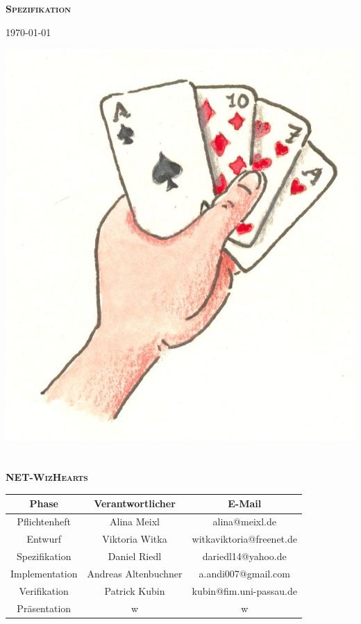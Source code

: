 \documentclass{article}
\begin{document}
\begin{titlepage}

\begin{center}
\textbf{\textsc{\LARGE Spezifikation}}

{\large \today}

\vspace{2cm}
\includegraphics{kartenspiel}
\ \\
\ \\

\textbf{\textsc{\LARGE NET-WizHearts}}
\vspace{2cm}

\begin{tabular}{|c|c|c|}\hline
   Phase & Verantwortlicher & E-Mail \\ \hline\hline
   Pflichtenheft & Alina Meixl &  alina@meixl.de \\ \hline
   Entwurf & Viktoria Witka & witkaviktoria@freenet.de \\ \hline
   Spezifikation & Daniel Riedl & dariedl14@yahoo.de \\ \hline
   Implementation & Andreas Altenbuchner& a.andi007@gmail.com\\ \hline
   Verifikation & Patrick Kubin & kubin@fim.uni-passau.de\\ \hline
   Präsentation & w& w\\ \hline
 \end{tabular}

\end{center}

\end{titlepage}
\end{document}
